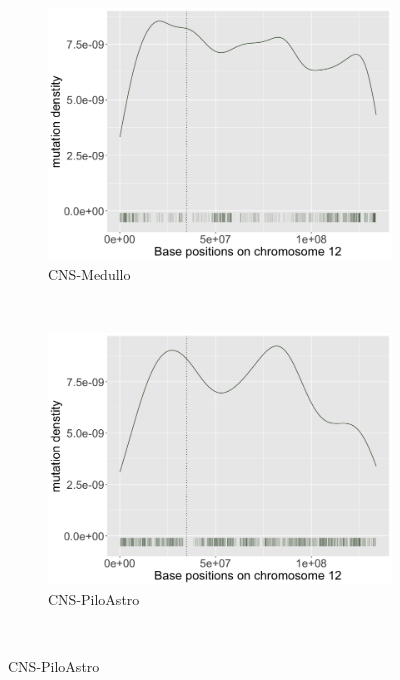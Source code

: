 \begin{figure}[h!]
    \begin{subfigure}{.5\textwidth}
    \includegraphics[width=\linewidth,height=0.6\textwidth]{graphics/mutdistribution_CNS-Medullo.png}
    \caption{CNS-Medullo}
    \end{subfigure}
    ~
    \begin{subfigure}{.5\textwidth}
    \includegraphics[width=\linewidth,height=0.6\textwidth]{graphics/mutdistribution_CNS-PiloAstro.png}
    \caption{CNS-PiloAstro}
    \end{subfigure} \\
    \vspace{0.2cm}
    

\end{figure}
